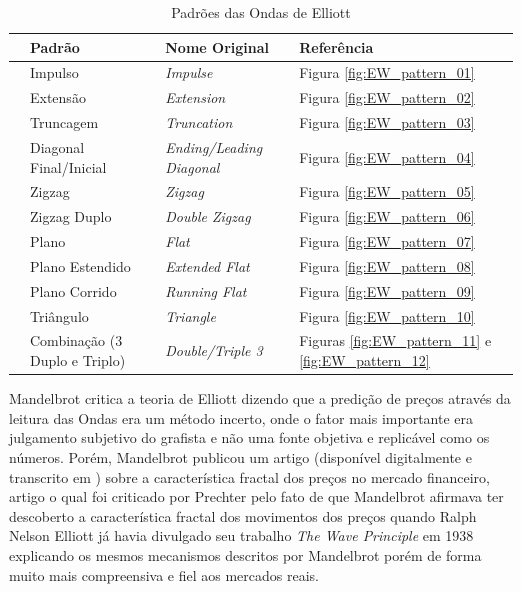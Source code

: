 \documentclass[12pt]{article}
\begin{document}
\begingroup
\begin{table}[H]
	\small
	\centering
	\caption{Padrões das Ondas de Elliott}
	\label{tab:ElliottWavePatterns}
\begin{tabular}{c C{5cm} C{5cm} L{2.5cm}}
	& \textbf{Padrão} & \textbf{Nome Original} & \textbf{Referência}\\
	\toprule
		& Impulso & \textit{Impulse} & Figura \ref{fig:EW_pattern_01} \\
		& Extensão & \textit{Extension} & Figura \ref{fig:EW_pattern_02} \\
		& Truncagem & \textit{Truncation} & Figura \ref{fig:EW_pattern_03} \\
		& Diagonal Final/Inicial & \textit{Ending/Leading Diagonal} & Figura \ref{fig:EW_pattern_04}\\
	\midrule
		& Zigzag & \textit{Zigzag} & Figura \ref{fig:EW_pattern_05}\\
		& Zigzag Duplo & \textit{Double Zigzag} & Figura \ref{fig:EW_pattern_06}\\
		& Plano & \textit{Flat} & Figura \ref{fig:EW_pattern_07}\\
		& Plano Estendido & \textit{Extended Flat} & Figura \ref{fig:EW_pattern_08}\\
		& Plano Corrido & \textit{Running Flat} & Figura \ref{fig:EW_pattern_09}\\
		& Triângulo & \textit{Triangle} & Figura \ref{fig:EW_pattern_10}\\
		& Combinação (3 Duplo e Triplo) & \textit{Double/Triple 3} & Figuras \ref{fig:EW_pattern_11} e \ref{fig:EW_pattern_12}
\end{tabular}
\end{table}
\endgroup

Mandelbrot \cite{MandelbrotHudson:2004} critica a teoria de Elliott dizendo que a predição
de preços através da leitura das Ondas era um método incerto, onde o fator mais importante
era julgamento subjetivo do grafista e não uma fonte objetiva e replicável como os números.
Porém, Mandelbrot publicou um artigo \cite{Mandelbrot:1999} (disponível digitalmente e
transcrito em \cite{MandelbrotHiprocrisy:1999}) sobre a característica fractal dos preços
no mercado financeiro, artigo o qual foi criticado por Prechter \cite{PrechterResponse:1999}
pelo fato de que Mandelbrot afirmava ter descoberto a característica fractal dos movimentos
dos preços quando Ralph Nelson Elliott já havia divulgado seu trabalho
\textit{The Wave Principle} \cite{Elliott:1938} em 1938 explicando os mesmos mecanismos
descritos por Mandelbrot porém de forma muito mais compreensiva e fiel aos mercados reais.
\end{document}
